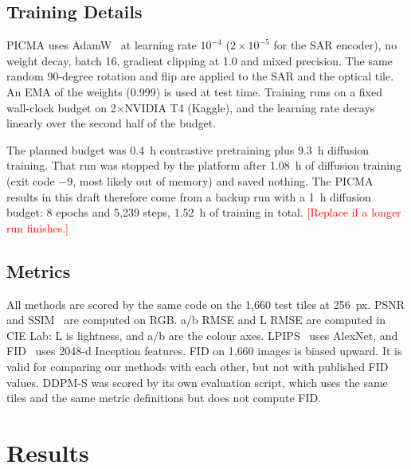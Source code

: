 \documentclass[conference]{IEEEtran}
\newcommand{\pend}[1]{\textcolor{red}{[#1]}}
\begin{document}
\subsection{Training Details}
PICMA uses AdamW~\cite{loshchilov2019adamw} at learning rate $10^{-4}$ ($2\times10^{-5}$ for the SAR encoder), no weight
decay, batch 16, gradient clipping at 1.0 and mixed precision. The same random 90-degree
rotation and flip are applied to the SAR and the optical tile. An EMA of the weights (0.999)
is used at test time. Training runs on a fixed wall-clock budget on 2$\times$NVIDIA T4
(Kaggle), and the learning rate decays linearly over the second half of the budget.

The planned budget was 0.4~h contrastive pretraining plus 9.3~h diffusion training. That run
was stopped by the platform after 1.08~h of diffusion training (exit code $-9$, most likely
out of memory) and saved nothing. The PICMA results in this draft therefore come from a
backup run with a 1~h diffusion budget: 8 epochs and 5{,}239 steps, 1.52~h of training in
total. \pend{Replace if a longer run finishes.}

\subsection{Metrics}
All methods are scored by the same code on the 1{,}660 test tiles at 256~px. PSNR and
SSIM~\cite{wang2004ssim} are computed on RGB. a/b RMSE and L RMSE are computed in CIE Lab:
L is lightness, and a/b are the colour axes. LPIPS~\cite{zhang2018lpips} uses AlexNet, and
FID~\cite{heusel2017fid} uses 2048-d Inception features. FID on 1{,}660 images is biased
upward. It is valid for comparing our methods with each other, but not with published FID
values. DDPM-S was scored by its own evaluation script, which uses the same tiles and the
same metric definitions but does not compute FID.

\section{Results}
\end{document}
